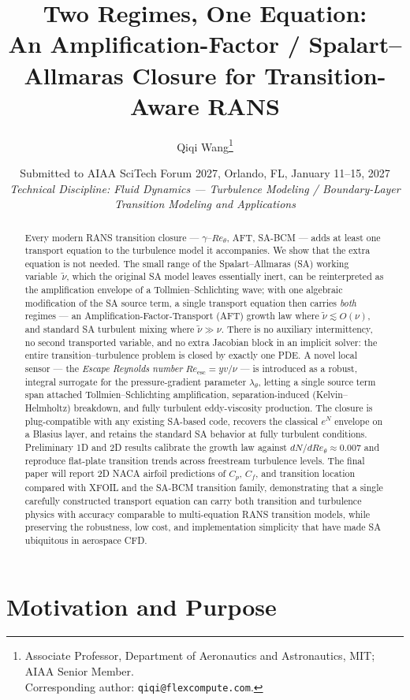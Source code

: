 \documentclass[11pt]{article}
\title{\bfseries Two Regimes, One Equation:\\
An Amplification-Factor / Spalart--Allmaras Closure for Transition-Aware RANS}
\author[1,2]{Qiqi Wang\thanks{Associate Professor, Department of Aeronautics and
Astronautics, MIT; AIAA Senior Member.\protect\\
Corresponding author: \texttt{qiqi@flexcompute.com}.}}
\affil[1]{Department of Aeronautics and Astronautics,
Massachusetts Institute of Technology, Cambridge, MA 02139, USA}
\affil[2]{Flexcompute Inc., Watertown, MA 02472, USA}
\date{Submitted to AIAA SciTech Forum 2027, Orlando, FL, January 11--15, 2027 \\
\textit{Technical Discipline: Fluid Dynamics --- Turbulence Modeling /
Boundary-Layer Transition Modeling and Applications}}
\begin{document}
\maketitle

\begin{abstract}
\noindent
Every modern RANS transition closure --- $\gamma$--$Re_\theta$, AFT,
SA-BCM --- adds at least one transport equation to the turbulence model
it accompanies. We show that the extra equation is not needed. The small
range of the Spalart--Allmaras (SA) working variable~$\tilde\nu$, which the
original SA model leaves essentially inert, can be reinterpreted as the
amplification envelope of a Tollmien--Schlichting wave; with one
algebraic modification of the SA source term, a single transport equation
then carries \emph{both} regimes --- an Amplification-Factor-Transport
(AFT) growth law where $\tilde\nu \!\lesssim\! O(\nu)$, and standard SA
turbulent mixing where $\tilde\nu \!\gg\! \nu$. There is no auxiliary
intermittency, no second transported variable, and no extra Jacobian
block in an implicit solver: the entire transition--turbulence problem
is closed by exactly one PDE. A novel
local sensor --- the \emph{Escape Reynolds number} $Re_{\mathrm{esc}}=yv/\nu$
--- is introduced as a robust, integral surrogate for the pressure-gradient
parameter $\lambda_\theta$, letting a single source term span attached
Tollmien--Schlichting amplification, separation-induced (Kelvin--Helmholtz)
breakdown, and fully turbulent eddy-viscosity production. The closure is
plug-compatible with any existing SA-based code, recovers the classical
$e^N$ envelope on a Blasius layer, and retains the standard SA behavior
at fully turbulent conditions. Preliminary 1D and 2D results
calibrate the growth law against $dN/dRe_\theta\!\approx\!0.007$ and reproduce
flat-plate transition trends across freestream turbulence levels. The final
paper will report 2D NACA airfoil predictions of $C_p$, $C_f$, and transition
location compared with XFOIL and the SA-BCM transition family, demonstrating
that a single carefully constructed transport equation can carry both
transition and turbulence physics with accuracy comparable to multi-equation
RANS transition models, while preserving the robustness, low cost, and
implementation simplicity that have made SA ubiquitous in aerospace CFD.
\end{abstract}

\section{Motivation and Purpose}
\end{document}

